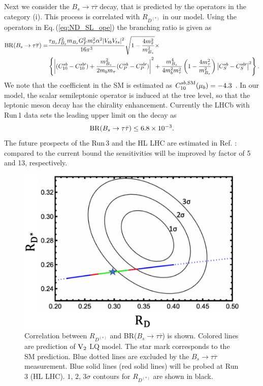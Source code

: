 \documentclass[12pt, a4paper]{article}
\numberwithin{equation}{section} %
\newcommand{\ov}{\overline}
\newcommand{\1}{\mbox{1}\hspace{-0.25em}\mbox{l}}
\begin{document}
Next we consider the $B_s \to \tau\ov\tau$ decay, that is predicted by
the operators in the category (i). This process is correlated with $R_{D^{(*)}}$ in our model.
Using the operators in Eq.\,(\ref{eq:ND_SL_ope}) the branching ratio is given as
\begin{align}
    {\rm{BR}}(B_s\to\tau\ov\tau)=&\frac{\tau_{B_{s}}f_{B_{s}}^2 m_{B_{s}} G_F^2 m_\tau^2 \alpha^2 |V_{tb} V_{ts}|^2}{16 \pi^3} \sqrt{1-\frac{4m_\tau^2}{m^2_{B_{s}}}}\times \nonumber\\
    &\left \{ \left |(C_{10}^{sb}-C_{10}^{sb\prime})+\frac{m^2_{B_{s}}}{2m_b m_\tau}(C_P^{sb}-C_P^{sb\prime}) \right|^2+\frac{m_{B_{s}}^4}{4m_b^2 m_\tau^2} \left( 1- \frac{4m_\tau^2}{m_{B_{s}}^2}\right) \left |C_S^{sb}-C_S^{sb\prime} \right|^2 \right \}.
\label{eq:Btotautau}
\end{align}
We note that the coefficient in the SM is estimated as
$C_{10}^{sb,{\rm{SM}}}(\mu_b)=-4.3$ \cite{Bobeth:1999mk,Huber:2005ig}.
In our model, the scalar semileptonic operator is induced at the tree level, so that the leptonic meson decay has the chirality enhancement.
Currently the LHCb with Run\,1 data sets the leading upper limit on the decay as \cite{LHCb:2017myy} 
\begin{align}
{\rm{BR}}(B_s\to\tau\bar{\tau})\le6.8\times10^{-3}.
\end{align}
The future prospects of the Run\,3 and the HL LHC are estimated in Ref. \cite{LHCb:2018roe}: compared to the current bound the sensitivities will be improved by factor of 5 and 13, respectively.
\begin{figure}[t]
\begin{center}
 \includegraphics[width=0.5 \textwidth]{Figs/RD_V2.pdf}
\end{center}
 \caption{
Correlation between $R_{D^{(*)}}$ and BR($B_s\to \tau\ov \tau$) is shown.
Colored lines are prediction of $\rm{V}_2$ LQ model. 
The star mark corresponds to the SM prediction.
Blue dotted lines are excluded by the $B_s\to\tau\ov\tau$ measurement.
Blue solid lines (red solid lines) will be probed at Run\,3 (HL LHC). 
$1,\,2,\,3\sigma$ contours for $R_{D^{(*)}}$ are shown in black.
  \label{fig:RD_Bstautau}
 }
\end{figure}
\end{document}
